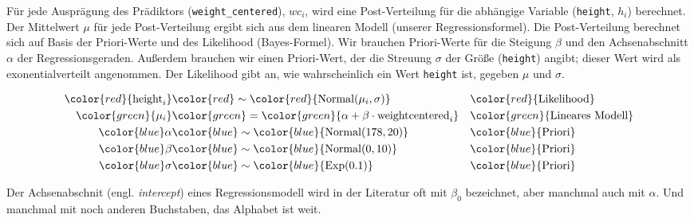\documentclass[
  a4paper,
  DIV=11]{scrreprt}
\theoremstyle{definition}
\theoremstyle{remark}
\begin{document}
Für jede Ausprägung des Prädiktors (\texttt{weight\_centered}),
\(wc_i\), wird eine Post-Verteilung für die abhängige Variable
(\texttt{height}, \(h_i\)) berechnet. Der Mittelwert \(\mu\) für jede
Post-Verteilung ergibt sich aus dem linearen Modell (unserer
Regressionsformel). Die Post-Verteilung berechnet sich auf Basis der
Priori-Werte und des Likelihood (Bayes-Formel). Wir brauchen
Priori-Werte für die Steigung \(\beta\) und den Achsenabschnitt
\(\alpha\) der Regressionsgeraden. Außerdem brauchen wir einen
Priori-Wert, der die Streuung \(\sigma\) der Größe (\texttt{height})
angibt; dieser Wert wird als exonentialverteilt angenommen. Der
Likelihood gibt an, wie wahrscheinlich ein Wert \texttt{height} ist,
gegeben \(\mu\) und \(\sigma\).

\begin{align*}
\color{red}{\text{height}_i} & \color{red}\sim \color{red}{\operatorname{Normal}(\mu_i, \sigma)} && \color{red}{\text{Likelihood}} \\
\color{green}{\mu_i} & \color{green}= \color{green}{\alpha + \beta\cdot \text{weightcentered}_i}  && \color{green}{\text{Lineares Modell} } \\
\color{blue}\alpha & \color{blue}\sim \color{blue}{\operatorname{Normal}(178, 20)} && \color{blue}{\text{Priori}} \\
\color{blue}\beta  & \color{blue}\sim \color{blue}{\operatorname{Normal}(0, 10)}  && \color{blue}{\text{Priori}}\\
\color{blue}\sigma & \color{blue}\sim \color{blue}{\operatorname{Exp}(0.1)}  && \color{blue}{\text{Priori}}
\end{align*}

\begin{tcolorbox}[enhanced jigsaw, title=\textcolor{quarto-callout-note-color}{\faInfo}\hspace{0.5em}{Hinweis}, bottomtitle=1mm, bottomrule=.15mm, titlerule=0mm, colbacktitle=quarto-callout-note-color!10!white, colframe=quarto-callout-note-color-frame, leftrule=.75mm, left=2mm, toprule=.15mm, colback=white, arc=.35mm, breakable, toptitle=1mm, opacityback=0, rightrule=.15mm, coltitle=black, opacitybacktitle=0.6]

Der Achsenabschnit (engl. \emph{intercept}) eines Regressionsmodell wird
in der Literatur oft mit \(\beta_0\) bezeichnet, aber manchmal auch mit
\(\alpha\). Und manchmal mit noch anderen Buchstaben, das Alphabet ist
weit. 🤷

\end{tcolorbox}
\end{document}
